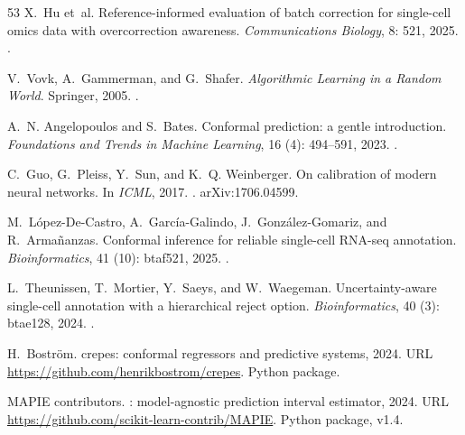 \documentclass[fleqn,10pt,lineno]{wlpeerj}  %
\begin{document}
\begin{thebibliography}{53}
X.~Hu et~al.
\newblock Reference-informed evaluation of batch correction for single-cell
  omics data with overcorrection awareness.
\newblock \emph{Communications Biology}, 8: 521, 2025.
\newblock {}.

V.~Vovk, A.~Gammerman, and G.~Shafer.
\newblock \emph{Algorithmic Learning in a Random World}.
\newblock Springer, 2005.
\newblock {}.

A.~N. Angelopoulos and S.~Bates.
\newblock Conformal prediction: a gentle introduction.
\newblock \emph{Foundations and Trends in Machine Learning}, 16
  (4): 494--591, 2023.
\newblock {}.

C.~Guo, G.~Pleiss, Y.~Sun, and K.~Q. Weinberger.
\newblock On calibration of modern neural networks.
\newblock In \emph{ICML}, 2017.
\newblock {}.
\newblock arXiv:1706.04599.

M.~L{\'o}pez-De-Castro, A.~Garc{\'i}a-Galindo, J.~Gonz{\'a}lez-Gomariz, and
  R.~Arma{\~n}anzas.
\newblock Conformal inference for reliable single-cell {RNA}-seq annotation.
\newblock \emph{Bioinformatics}, 41 (10): btaf521, 2025.
\newblock {}.

L.~Theunissen, T.~Mortier, Y.~Saeys, and W.~Waegeman.
\newblock Uncertainty-aware single-cell annotation with a hierarchical reject
  option.
\newblock \emph{Bioinformatics}, 40 (3): btae128, 2024.
\newblock {}.

H.~Bostr{\"o}m.
\newblock crepes: conformal regressors and predictive systems, 2024.
\newblock URL \url{https://github.com/henrikbostrom/crepes}.
\newblock Python package.

{MAPIE contributors}.
: model-agnostic prediction interval estimator, 2024.
\newblock URL \url{https://github.com/scikit-learn-contrib/MAPIE}.
\newblock Python package, v1.4.


\end{thebibliography}
\end{document}
